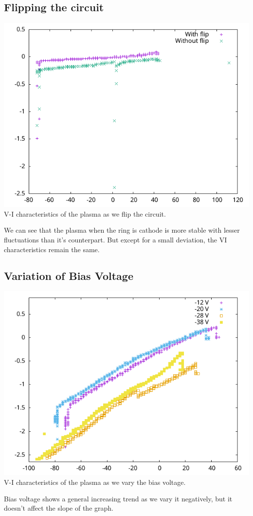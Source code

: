 \documentclass[]{report}[12 pt]
\begin{document}
\subsection*{Flipping the circuit}
\begin{center}
	\includegraphics{flipping.png}\\
	V-I characteristics of the plasma as we flip the circuit.
\end{center}
We can see that the plasma when the ring is cathode is more stable with lesser fluctuations than it's counterpart. But except for a small deviation, the VI characteristics remain the same.

\subsection*{Variation of Bias Voltage}
\begin{center}
	\includegraphics{variationbias.png}\\
	V-I characteristics of the plasma as we vary the bias voltage.
\end{center}
Bias voltage shows a general increasing trend as we vary it negatively, but it doesn't affect the slope of the graph.
\end{document}
